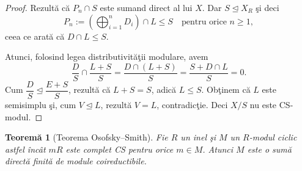 \documentclass[12pt,a4paper]{book}
\newcommand{\ess}{\trianglelefteq}  %
\theoremstyle{plain}
\newtheorem{theorem}{Teoremă}[section] %
\theoremstyle{definition}
\theoremstyle{remark}
\begin{document}
\begin{proof}
Rezultă că \(P_n \cap S\) este sumand direct al lui \(X\).
Dar \(S \ess X_R\) şi deci
\[
P_n := \left(\bigoplus_{i=1}^n D_i\right) \cap L \leq S
\quad \text{pentru orice } n \geq 1,
\]
ceea ce arată că \(D \cap L \leq S\).

Atunci, folosind legea distributivităţii modulare, avem
\[
\frac{D}{S} \cap \frac{L+S}{S}
   = \frac{D \cap (L+S)}{S}
   = \frac{S + D \cap L}{S}
   = 0.
\]
Cum
\(\dfrac{D}{S} \ess \dfrac{E+S}{S}\),
rezultă că \(L+S = S\), adică \(L \leq S\).
Obţinem că \(L\) este semisimplu şi, cum \(V \ess L\),
rezultă \(V = L\), contradicţie.
Deci \(X/S\) nu este CS-modul.
\end{proof}


\begin{theorem}[Teorema Osofsky–Smith]\label{thm:Osofsky-Smith}
Fie \(R\) un inel şi \(M\) un \(R\)-modul ciclic astfel încât
\(mR\) este complet CS pentru orice \(m \in M\).
Atunci \(M\) este o sumă directă finită de module coireductibile.
\end{theorem}
\end{document}
